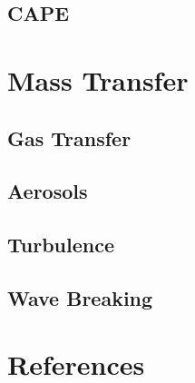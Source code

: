 \documentclass{report}
\begin{document}
    \section{CAPE}
\label{cape}
    \lipsum[1-2]

\chapter{Mass Transfer}
\label{masstransfer}
    \lipsum[10]
  
    \section{Gas Transfer}
\label{gastransfer}
    \lipsum[1-2]
   
    \section{Aerosols}
\label{aerosols}
    \lipsum[1-2]

    \section{Turbulence}
\label{massturbulence}
    \lipsum[1-2]
  
    \section{Wave Breaking}
\label{masswavebreaking}
    \lipsum[1-2]

\chapter{References}


  
\end{document}
